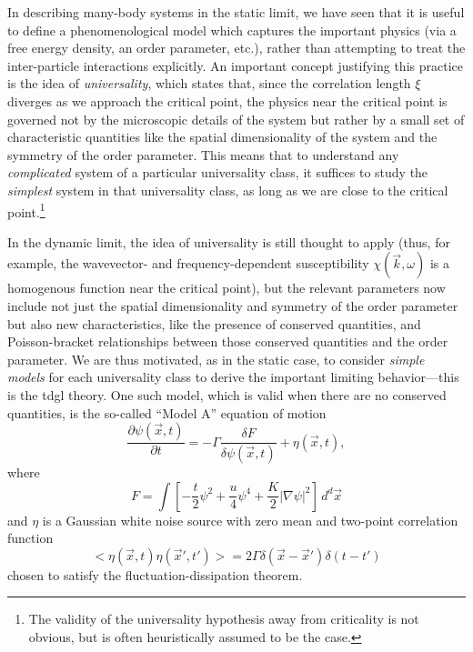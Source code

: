 In describing many-body systems in the static limit, we have seen that it is useful to define a phenomenological model which captures the important physics (via a free energy density, an order parameter, etc.), rather than attempting to treat the inter-particle interactions explicitly.
An important concept justifying this practice is the idea of \emph{universality}, which states that, since the correlation length $\xi$ diverges as we approach the critical point, the physics near the critical point is governed not by the microscopic details of the system but rather by a small set of characteristic quantities like the spatial dimensionality of the system and the symmetry of the order parameter\citep{wilson_renormalization_1974}.
This means that to understand any \emph{complicated} system of a particular universality class, it suffices to study the \emph{simplest} system in that universality class, as long as we are close to the critical point.\footnote{The validity of the universality hypothesis away from criticality is not obvious, but is often heuristically assumed to be the case.}

In the dynamic limit, the idea of universality is still thought to apply (thus, for example, the wavevector- and frequency-dependent susceptibility $\chi(\vec{k}, \omega)$ is a homogenous function near the critical point), but the relevant parameters now include not just the spatial dimensionality and symmetry of the order parameter but also new characteristics, like the presence of conserved quantities, and Poisson-bracket relationships between those conserved quantities and the order parameter\citep{hohenberg_theory_1977}.
We are thus motivated, as in the static case, to consider \emph{simple models} for each universality class to derive the important limiting behavior---this is the \gls{tdgl} theory.
One such model, which is valid when there are no conserved quantities, is the so-called ``Model A'' equation of motion
\begin{equation}\label{eq:modelaequation}
\frac{\partial\psi(\vec{x}, t)}{\partial t} = -\Gamma \frac{\delta F}{\delta \psi(\vec{x}, t)}+\eta(\vec{x}, t),
\end{equation}
where
\begin{equation}
F = \int \left[-\frac{t}{2}\psi^2+\frac{u}{4}\psi^4+\frac{K}{2}|\nabla \psi|^2\right] \, d^d\vec{x}
\end{equation}
and $\eta$ is a Gaussian white noise source with zero mean and two-point correlation function
\begin{equation}
\big<\eta(\vec{x}, t)\eta(\vec{x}', t')\big>=2\Gamma \delta(\vec{x}-\vec{x}')\delta(t-t')
\end{equation}
chosen to satisfy the fluctuation-dissipation theorem.

